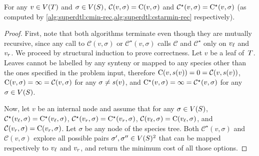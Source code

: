 \begin{lemma}
    For any \(v \in V(T)\) and \(\sigma \in V(S)\), \(\mathcal{C}(v, \sigma) = \mathrm{C}(v, \sigma)\) and \(\mathcal{C}^\star(v, \sigma) = \mathrm{C^\star}(v, \sigma)\) (as computed by \cref{alg:superdtl:cmin-rec,alg:superdtl:cstarmin-rec} respectively).
\end{lemma}
\begin{proof}
    First, note that both algorithms terminate even though they are mutually recursive, since any call to \(\mathcal{C}(v, \sigma)\) or \(\mathcal{C}^\star(v, \sigma)\) calls \(\mathcal{C}\) and \(\mathcal{C}^\star\) only on \(v_\mathit{\ell}\) and \(v_r\).
    We proceed by structural induction to prove correctness.
    Let \(v\) be a leaf of~\(T\).
    Leaves cannot be labelled by any synteny or mapped to any species other than the ones specified in the problem input, therefore \(\mathrm{C}(v, s(v)) = 0 = \mathcal{C}(v, s(v))\), \(\mathrm{C}(v, \sigma) = \infty = \mathcal{C}(v, \sigma)\) for any \(\sigma \neq s(v)\), and \(\mathrm{C^\star}(v, \sigma) = \infty = \mathcal{C}^\star(v, \sigma)\) for any \(\sigma \in V(S)\).

    Now, let \(v\) be an internal node and assume that for any \(\sigma \in V(S)\), \(\mathcal{C}^\star(v_\mathit{\ell}, \sigma) = \mathrm{C^\star}(v_\mathit{\ell}, \sigma)\), \(\mathcal{C}^\star(v_r, \sigma) = \mathrm{C^\star}(v_r, \sigma)\), \(\mathcal{C}(v_\mathit{\ell}, \sigma) = \mathrm{C}(v_\mathit{\ell}, \sigma)\), and \(\mathcal{C}(v_r, \sigma) = \mathrm{C}(v_r, \sigma)\).
    Let \(\sigma\) be any node of the species tree.
    Both \(\mathcal{C}^\star(v, \sigma)\) and \(\mathcal{C}(v, \sigma)\) explore all possible pairs \(\sigma', \sigma'' \in V(S)^2\) that can be mapped respectively to \(v_\mathit{\ell}\) and \(v_r\), and return the minimum cost of all those options.


\end{proof}

